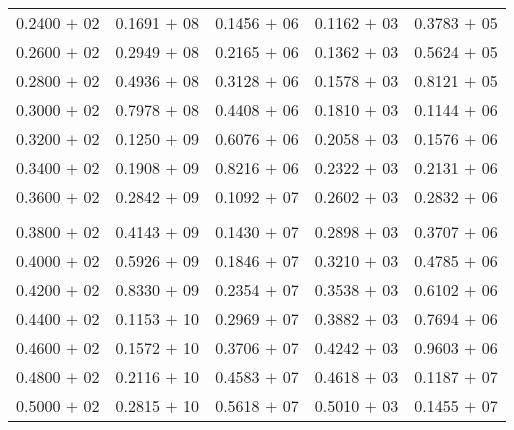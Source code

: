 \documentclass[a4paper,11pt]{article}
\begin{document}
\begin{center}
\begin{longtable}{ c c c c c }
0.2400 $+$ 02 & 0.1691 $+$ 08 & 0.1456 $+$ 06 & 0.1162 $+$ 03 & 0.3783 $+$ 05 \\
0.2600 $+$ 02 & 0.2949 $+$ 08 & 0.2165 $+$ 06 & 0.1362 $+$ 03 & 0.5624 $+$ 05 \\
0.2800 $+$ 02 & 0.4936 $+$ 08 & 0.3128 $+$ 06 & 0.1578 $+$ 03 & 0.8121 $+$ 05 \\
0.3000 $+$ 02 & 0.7978 $+$ 08 & 0.4408 $+$ 06 & 0.1810 $+$ 03 & 0.1144 $+$ 06 \\
0.3200 $+$ 02 & 0.1250 $+$ 09 & 0.6076 $+$ 06 & 0.2058 $+$ 03 & 0.1576 $+$ 06 \\
0.3400 $+$ 02 & 0.1908 $+$ 09 & 0.8216 $+$ 06 & 0.2322 $+$ 03 & 0.2131 $+$ 06 \\
0.3600 $+$ 02 & 0.2842 $+$ 09 & 0.1092 $+$ 07 & 0.2602 $+$ 03 & 0.2832 $+$ 06 \\
\\
0.3800 $+$ 02 & 0.4143 $+$ 09 & 0.1430 $+$ 07 & 0.2898 $+$ 03 & 0.3707 $+$ 06 \\
0.4000 $+$ 02 & 0.5926 $+$ 09 & 0.1846 $+$ 07 & 0.3210 $+$ 03 & 0.4785 $+$ 06 \\
0.4200 $+$ 02 & 0.8330 $+$ 09 & 0.2354 $+$ 07 & 0.3538 $+$ 03 & 0.6102 $+$ 06 \\
0.4400 $+$ 02 & 0.1153 $+$ 10 & 0.2969 $+$ 07 & 0.3882 $+$ 03 & 0.7694 $+$ 06 \\
0.4600 $+$ 02 & 0.1572 $+$ 10 & 0.3706 $+$ 07 & 0.4242 $+$ 03 & 0.9603 $+$ 06 \\
0.4800 $+$ 02 & 0.2116 $+$ 10 & 0.4583 $+$ 07 & 0.4618 $+$ 03 & 0.1187 $+$ 07 \\
0.5000 $+$ 02 & 0.2815 $+$ 10 & 0.5618 $+$ 07 & 0.5010 $+$ 03 & 0.1455 $+$ 07 \\
\end{longtable}
\end{center}
\end{document}
